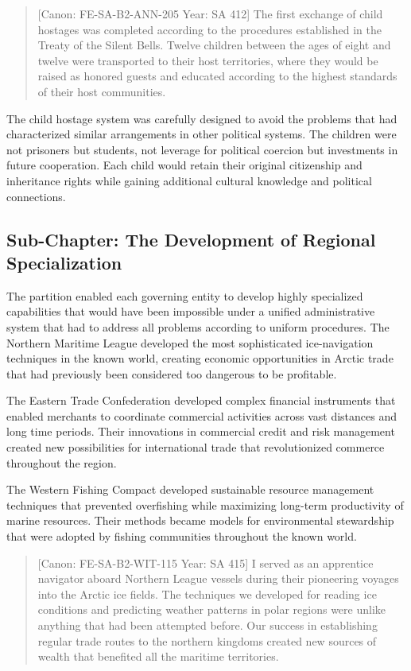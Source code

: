 \begin{quote}
{[}Canon: FE-SA-B2-ANN-205 \textbar{} Year: SA 412{]} The first exchange
of child hostages was completed according to the procedures established
in the Treaty of the Silent Bells. Twelve children between the ages of
eight and twelve were transported to their host territories, where they
would be raised as honored guests and educated according to the highest
standards of their host communities.
\end{quote}

The child hostage system was carefully designed to avoid the problems
that had characterized similar arrangements in other political systems.
The children were not prisoners but students, not leverage for political
coercion but investments in future cooperation. Each child would retain
their original citizenship and inheritance rights while gaining
additional cultural knowledge and political connections.

\subsection{Sub-Chapter: The Development of Regional
Specialization}\label{sub-chapter-the-development-of-regional-specialization}

The partition enabled each governing entity to develop highly
specialized capabilities that would have been impossible under a unified
administrative system that had to address all problems according to
uniform procedures. The Northern Maritime League developed the most
sophisticated ice-navigation techniques in the known world, creating
economic opportunities in Arctic trade that had previously been
considered too dangerous to be profitable.

The Eastern Trade Confederation developed complex financial instruments
that enabled merchants to coordinate commercial activities across vast
distances and long time periods. Their innovations in commercial credit
and risk management created new possibilities for international trade
that revolutionized commerce throughout the region.

The Western Fishing Compact developed sustainable resource management
techniques that prevented overfishing while maximizing long-term
productivity of marine resources. Their methods became models for
environmental stewardship that were adopted by fishing communities
throughout the known world.

\begin{quote}
{[}Canon: FE-SA-B2-WIT-115 \textbar{} Year: SA 415{]} I served as an
apprentice navigator aboard Northern League vessels during their
pioneering voyages into the Arctic ice fields. The techniques we
developed for reading ice conditions and predicting weather patterns in
polar regions were unlike anything that had been attempted before. Our
success in establishing regular trade routes to the northern kingdoms
created new sources of wealth that benefited all the maritime
territories.
\end{quote}

